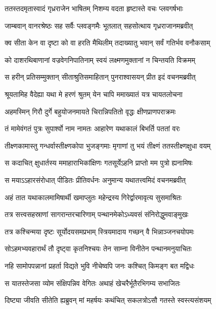 
\twolineshloka
{ततस्तदमृतास्वादं गृध्रराजेन भाषितम्}
{निशम्य वदता हृष्टास्ते वचः प्लवगर्षभाः} %

\twolineshloka
{जाम्बवान् वानरश्रेष्ठः सह सर्वैः प्लवङ्गमैः}
{भूतलात् सहसोत्थाय गृध्रराजानमब्रवीत्} %

\twolineshloka
{क्व सीता केन वा दृष्टा को वा हरति मैथिलीम्}
{तदाख्यातु भवान् सर्वं गतिर्भव वनौकसाम्} %

\twolineshloka
{को दाशरथिबाणानां वज्रवेगनिपातिनाम्}
{स्वयं लक्ष्मणमुक्तानां न चिन्तयति विक्रमम्} %

\twolineshloka
{स हरीन् प्रतिसम्मुक्तान् सीताश्रुतिसमाहितान्}
{पुनराश्वासयन् प्रीत इदं वचनमब्रवीत्} %

\twolineshloka
{श्रूयतामिह वैदेह्या यथा मे हरणं श्रुतम्}
{येन चापि ममाख्यातं यत्र चायतलोचना} %

\twolineshloka
{अहमस्मिन् गिरौ दुर्गे बहुयोजनमायते}
{चिरान्निपतितो वृद्धः क्षीणप्राणपराक्रमः} %

\twolineshloka
{तं मामेवंगतं पुत्रः सुपार्श्वो नाम नामतः}
{आहारेण यथाकालं बिभर्ति पततां वरः} %

\twolineshloka
{तीक्ष्णकामास्तु गन्धर्वास्तीक्ष्णकोपा भुजङ्गमाः}
{मृगाणां तु भयं तीक्ष्णं ततस्तीक्ष्णक्षुधा वयम्} %

\twolineshloka
{स कदाचित् क्षुधार्तस्य ममाहाराभिकांक्षिणः}
{गतसूर्येऽहनि प्राप्तो मम पुत्रो ह्यनामिषः} %

\twolineshloka
{स मयाऽऽहारसंरोधात् पीडितः प्रीतिवर्धनः}
{अनुमान्य यथातत्त्वमिदं वचनमब्रवीत्} %

\twolineshloka
{अहं तात यथाकालमामिषार्थी खमाप्लुतः}
{महेन्द्रस्य गिरेर्द्वारमावृत्य सुसमाश्रितः} %

\twolineshloka
{तत्र सत्त्वसहस्राणां सागरान्तरचारिणाम्}
{पन्थानमेकोऽध्यवसं संनिरोद्धुमवाङ्मुखः} %

\twolineshloka
{तत्र कश्चिन्मया दृष्टः सूर्योदयसमप्रभाम्}
{स्त्रियमादाय गच्छन् वै भिन्नाञ्जनचयोपमः} %

\twolineshloka
{सोऽहमभ्यवहारार्थं तौ दृष्ट्वा कृतनिश्चयः}
{तेन साम्ना विनीतेन पन्थानमनुयाचितः} %

\twolineshloka
{नहि सामोपपन्नानां प्रहर्ता विद्यते भुवि}
{नीचेष्वपि जनः कश्चित् किमङ्ग बत मद्विधः} %

\twolineshloka
{स यातस्तेजसा व्योम संक्षिपन्निव वेगितः}
{अथाहं खेचरैर्भूतैरभिगम्य सभाजितः} %

\twolineshloka
{दिष्ट्या जीवति सीतेति ह्यब्रुवन् मां महर्षयः}
{कथंचित् सकलत्रोऽसौ गतस्ते स्वस्त्यसंशयम्} %

